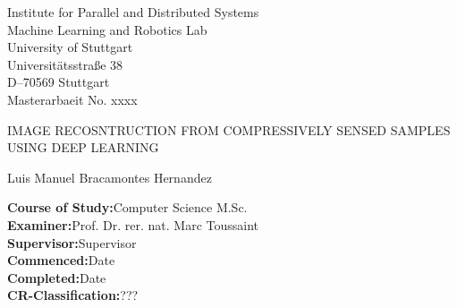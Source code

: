 \begin{titlepage}

\centering
\sffamily
%
\small
Institute for Parallel and Distributed Systems \\
Machine Learning and Robotics Lab\\
\null\vspace{0.5cm}
University of Stuttgart\\
Universitätsstraße 38\\
D–70569 Stuttgart\\

\null\vspace{1cm}
Masterarbaeit No. xxxx

\large
\null\vspace{1.5cm}
{\huge IMAGE RECOSNTRUCTION FROM COMPRESSIVELY SENSED SAMPLES  USING DEEP LEARNING\\[12pt] 
} 
\null\vspace{0.2cm}

\small
Luis Manuel Bracamontes Hernandez

\raggedright
\null\vspace{1.5cm}
\textbf{Course of Study:}\null\hspace{0.1cm}Computer Science M.Sc.\\
\null\vspace{0.7cm}
\textbf{Examiner:}\null\hspace{0.1cm}Prof. Dr. rer. nat. Marc Toussaint\\
\null\vspace{0.01cm}
\textbf{Supervisor:}\null\hspace{0.1cm}Supervisor\\
\null\vspace{1cm}
\textbf{Commenced:}\null\hspace{0.1cm}Date\\
\null\vspace{0.01cm}
\textbf{Completed:}\null\hspace{0.1cm}Date\\
\null\vspace{1cm}
\textbf{CR-Classification:}\null\hspace{0.1cm}???\\


\vspace{2cm}
\end{titlepage}




